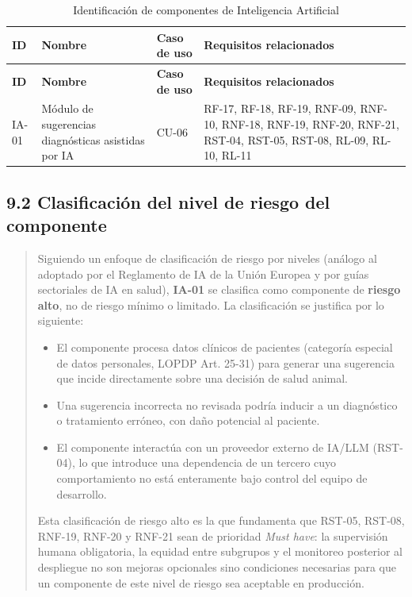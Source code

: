 \documentclass[
]{article}
\begin{document}
\begin{longtable}{|
  >{\raggedright\arraybackslash}p{}|
  >{\raggedright\arraybackslash}p{}|
  >{\raggedright\arraybackslash}p{}|
  >{\raggedright\arraybackslash}p{}|}
\caption{Identificación de componentes de Inteligencia Artificial}
\label{tab:componentes-ia} \\
\hline
\textbf{ID} &
\textbf{Nombre} &
\textbf{Caso de uso} &
\textbf{Requisitos relacionados} \\
\hline
\endfirsthead

\hline
\textbf{ID} &
\textbf{Nombre} &
\textbf{Caso de uso} &
\textbf{Requisitos relacionados} \\
\hline
\endhead

IA-01 &
Módulo de sugerencias diagnósticas asistidas por IA &
CU-06 &
RF-17, RF-18, RF-19, RNF-09, RNF-10, RNF-18, RNF-19, RNF-20, RNF-21,
RST-04, RST-05, RST-08, RL-09, RL-10, RL-11 \\
\hline

\end{longtable}

\subsection{9.2 Clasificación del nivel de riesgo del componente}
\label{s9-2-clasificacion-riesgo}

\begin{quote}
Siguiendo un enfoque de clasificación de riesgo por niveles (análogo al
adoptado por el Reglamento de IA de la Unión Europea y por guías
sectoriales de IA en salud), \textbf{IA-01} se clasifica como componente
de \textbf{riesgo alto}, no de riesgo mínimo o limitado. La clasificación
se justifica por lo siguiente:

\begin{itemize}
  \item El componente procesa datos clínicos de pacientes (categoría
  especial de datos personales, LOPDP Art. 25-31) para generar una
  sugerencia que incide directamente sobre una decisión de salud animal.
  \item Una sugerencia incorrecta no revisada podría inducir a un
  diagnóstico o tratamiento erróneo, con daño potencial al paciente.
  \item El componente interactúa con un proveedor externo de IA/LLM
  (RST-04), lo que introduce una dependencia de un tercero cuyo
  comportamiento no está enteramente bajo control del equipo de
  desarrollo.
\end{itemize}

Esta clasificación de riesgo alto es la que fundamenta que RST-05,
RST-08, RNF-19, RNF-20 y RNF-21 sean de prioridad \emph{Must have}: la
supervisión humana obligatoria, la equidad entre subgrupos y el
monitoreo posterior al despliegue no son mejoras opcionales sino
condiciones necesarias para que un componente de este nivel de riesgo
sea aceptable en producción.
\end{quote}
\end{document}

